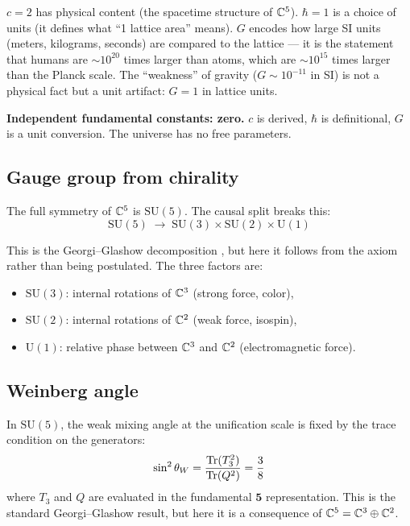 $c = 2$ has physical content (the spacetime structure of $\mathbb{C}^5$). $\hbar = 1$ is a choice of units (it defines what ``1 lattice area'' means). $G$ encodes how large SI units (meters, kilograms, seconds) are compared to the lattice --- it is the statement that humans are $\sim\!10^{20}$ times larger than atoms, which are $\sim\!10^{15}$ times larger than the Planck scale. The ``weakness'' of gravity ($G \sim 10^{-11}$ in SI) is not a physical fact but a unit artifact: $G = 1$ in lattice units.

\textbf{Independent fundamental constants: zero.} $c$ is derived, $\hbar$ is definitional, $G$ is a unit conversion. The universe has no free parameters.

\subsection{Gauge group from chirality}

The full symmetry of $\mathbb{C}^5$ is $\text{SU}(5)$. The causal split breaks this:
\begin{equation}
\text{SU}(5) \;\to\; \text{SU}(3) \times \text{SU}(2) \times \text{U}(1)
\end{equation}

This is the Georgi--Glashow decomposition \cite{GeorgiGlashow}, but here it follows from the axiom rather than being postulated. The three factors are:
\begin{itemize}
\item $\text{SU}(3)$: internal rotations of $\mathbb{C}^3$ (strong force, color),
\item $\text{SU}(2)$: internal rotations of $\mathbb{C}^2$ (weak force, isospin),
\item $\text{U}(1)$: relative phase between $\mathbb{C}^3$ and $\mathbb{C}^2$ (electromagnetic force).
\end{itemize}

\subsection{Weinberg angle}

In $\text{SU}(5)$, the weak mixing angle at the unification scale is fixed by the trace condition on the generators:
\begin{equation}
\sin^2\theta_W = \frac{\operatorname{Tr}(T_3^2)}{\operatorname{Tr}(Q^2)} = \frac{3}{8}
\end{equation}
where $T_3$ and $Q$ are evaluated in the fundamental $\mathbf{5}$ representation. This is the standard Georgi--Glashow result, but here it is a consequence of $\mathbb{C}^5 = \mathbb{C}^3 \oplus \mathbb{C}^2$.

